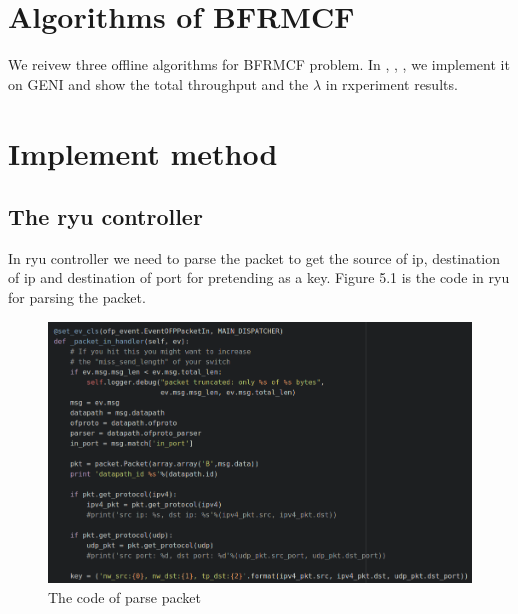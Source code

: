 \documentclass[a4paper,12pt]{report}
\begin{document}
\begin{large}
\section{Algorithms of BFRMCF}
\qquad We reivew three offline algorithms for BFRMCF problem. In \cite{our}, \cite{grag}, \cite{gk}, we implement it on GENI and show the total throughput and the $\lambda$ in rxperiment results.
\section{Implement method}
\subsection{ The ryu controller}
  \qquad In ryu controller we need to parse the packet to get the source of ip, destination of ip and destination of port for pretending as a key. Figure 5.1 is the code in ryu for parsing the packet.
  \begin{figure}[b]
	          \caption{The code of parse packet}
	          \centering
	            \includegraphics[width=1.0\textwidth]{ryu_controller_parse.png}
	      	\end{figure}

\end{large}
\end{document}

